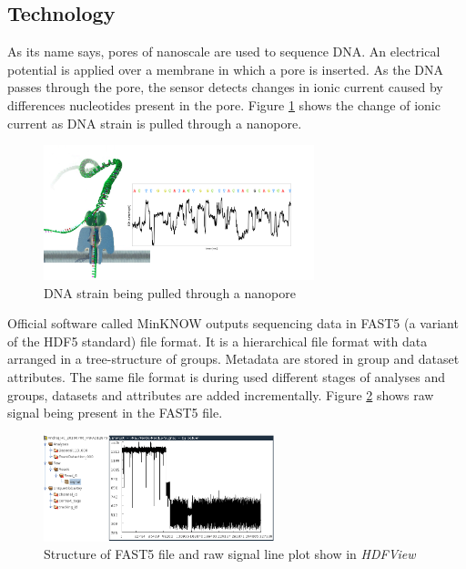 \documentclass[times, utf8, diplomski, numeric, english]{fer}
\begin{document}
\subsection{Technology}
As its name says, pores of nanoscale are used to sequence DNA. An electrical potential is applied over a membrane in which a  pore is inserted. 
As the DNA passes through the pore, the sensor detects changes in ionic current caused by differences nucleotides present in the pore. Figure \ref{fg:nanopore} shows the change of ionic current as DNA strain is pulled through a nanopore.

\begin{figure}[!ht]
	\begin{center}
		\includegraphics[width=0.7\textwidth]{./imgs/nanopore.png}
		
		\caption[DNA strain being pulled through a nanopore]{DNA strain being pulled through a nanopore \protect\footnotemark}
		\label{fg:nanopore}
	\end{center}
\end{figure}

Official software called MinKNOW outputs sequencing data in FAST5 (a variant of the HDF5 standard) file format. It is a hierarchical file format with data arranged in a tree-structure of groups. Metadata are stored in group and dataset attributes. The same file format is during used different stages of analyses and groups, datasets and attributes are added incrementally. Figure \ref{fg:fast5} shows raw signal being present in the FAST5 file.
\begin{figure}[!ht]
	\begin{center}
		\includegraphics[width=0.6\textwidth]{./imgs/fast5.png}
		\caption[Structure of FAST5 file and raw signal plot show in \textit{HDFView}]{Structure of FAST5 file and raw signal line plot show in \textit{HDFView} \protect\footnotemark}
		\label{fg:fast5}
	\end{center}
\end{figure}
\end{document}
